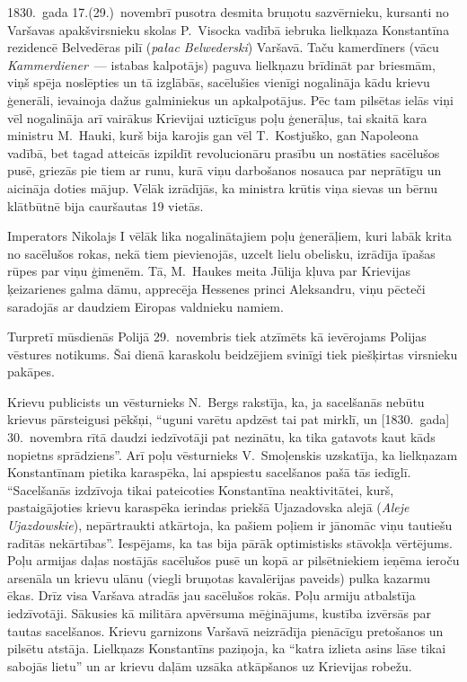 \documentclass[twoside,a5paper,12pt,fleqn,openany]{extbook}
\newcommand{\pltxti}[1]{\textit{\textpolish{#1}}}
\newcommand{\detxti}[1]{\textit{\textgerman{#1}}}
\begin{document}
1830.~gada 17.(29.)~novembrī pusotra desmita bruņotu sazvērnieku, kursanti no Varšavas apakšvirsnieku skolas P.~Visocka vadībā iebruka lielkņaza Konstantīna rezidencē Belvedēras pilī (\pltxti{pałac Belwederski}) Varšavā. Taču kamerdīners (vācu \detxti{Kammerdiener}~--- istabas kalpotājs) paguva lielkņazu brīdināt par briesmām, viņš spēja noslēpties un tā izglābās, sacēlušies vienīgi nogalināja kādu krievu ģenerāli, ievainoja dažus galminiekus un apkalpotājus. Pēc tam pilsētas ielās viņi vēl nogalināja arī vairākus Krievijai uzticīgus poļu ģenerāļus, tai skaitā kara ministru M.~Hauki, kurš bija karojis gan vēl T.~Kostjuško, gan Napoleona vadībā, bet tagad atteicās izpildīt revolucionāru prasību un nostāties sacēlušos pusē, griezās pie tiem ar runu, kurā viņu darbošanos nosauca par neprātīgu un aicināja doties mājup. Vēlāk izrādījās, ka ministra krūtis viņa sievas un bērnu klātbūtnē bija cauršautas 19 vietās.

Imperators Nikolajs I vēlāk lika nogalinātajiem poļu ģenerāļiem, kuri labāk krita no sacēlušos rokas, nekā tiem pievienojās, uzcelt lielu obelisku, izrādīja īpašas rūpes par viņu ģimenēm. Tā, M.~Haukes meita Jūlija kļuva par Krievijas ķeizarienes galma dāmu, apprecēja Hessenes princi Aleksandru, viņu pēcteči saradojās ar daudziem Eiropas valdnieku namiem.

Turpretī mūsdienās Polijā 29.~novembris tiek atzīmēts kā ievērojams Polijas vēstures notikums. Šai dienā karaskolu beidzējiem svinīgi tiek piešķirtas virsnieku pakāpes.

Krievu publicists un vēsturnieks N.~Bergs rakstīja, ka, ja sacelšanās nebūtu krievus pārsteigusi pēkšņi, ``uguni varētu apdzēst tai pat mirklī, un [1830.~gada] 30.~novembra rītā daudzi iedzīvotāji pat nezinātu, ka tika gatavots kaut kāds nopietns sprādziens''. Arī poļu vēsturnieks V.~Smoļenskis uzskatīja, ka lielkņazam Konstantīnam pietika karaspēka, lai apspiestu sacelšanos pašā tās iedīglī. ``Sacelšanās izdzīvoja tikai pateicoties Konstantīna neaktivitātei, kurš, pastaigājoties krievu karaspēka ierindas priekšā Ujazadovska alejā (\pltxti{Aleje Ujazdowskie}), nepārtraukti atkārtoja, ka pašiem poļiem ir jānomāc viņu tautiešu radītās nekārtības''. Iespējams, ka tas bija pārāk optimistisks stāvokļa vērtējums. Poļu armijas daļas nostājās sacēlušos pusē un kopā ar pilsētniekiem ieņēma ieroču arsenāla un krievu ulānu (viegli bruņotas kavalērijas paveids) pulka kazarmu ēkas. Drīz visa Varšava atradās jau sacēlušos rokās. Poļu armiju atbalstīja iedzīvotāji. Sākusies kā militāra apvērsuma mēģinājums, kustība izvērsās par tautas sacelšanos. Krievu garnizons Varšavā neizrādīja pienācīgu pretošanos un pilsētu atstāja. Lielkņazs Konstantīns paziņoja, ka ``katra izlieta asins lāse tikai sabojās lietu'' un ar krievu daļām uzsāka atkāpšanos uz Krievijas robežu.
\end{document}
